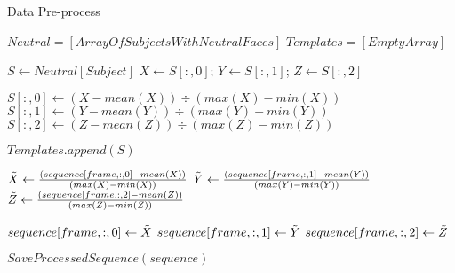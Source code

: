 \documentclass[10pt,twocolumn,letterpaper]{article}
\begin{document}
\begin{algorithm}
\caption{Data Pre-process}\label{alg:preprocess}
\begin{algorithmic}

\State $Neutral = [Array Of Subjects With Neutral Faces]$
\State $Templates = [EmptyArray]$

\State $S \gets Neutral[Subject]$
\State $X \gets S[:, 0]$; $Y \gets S[:, 1]$; $Z \gets S[:, 2]$ 


\State $S[:, 0] \gets (X - mean(X)) \div (max(X) - min(X))$
\State $S[:, 1] \gets (Y - mean(Y)) \div (max(Y) - min(Y))$
\State $S[:, 2] \gets (Z - mean(Z)) \div (max(Z) - min(Z))$

\State $Templates.append(S)$





\State $\Tilde{X} \gets \frac{(sequence[frame,:,0] - mean(X))}{(max(X) - min(X))}$
\newline
\State $\Tilde{Y} \gets \frac{(sequence[frame,:,1] - mean(Y))}{(max(Y) - min(Y))}$
\newline
\State $\Tilde{Z} \gets \frac{(sequence[frame,:,2] - mean(Z))}{(max(Z) - min(Z))}$


\State $sequence[frame,:,0] \gets \Tilde{X}$
\State $sequence[frame,:,1] \gets \Tilde{Y}$
\State $sequence[frame,:,2] \gets \Tilde{Z}$

\EndWhile

\State $SaveProcessedSequence(sequence)$

\EndWhile

\EndWhile

\end{algorithmic}
\end{algorithm}
\end{document}
